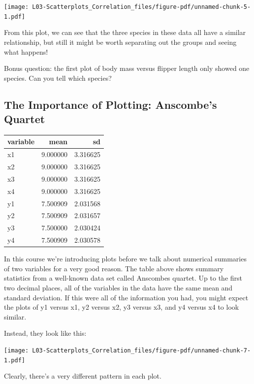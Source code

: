 \documentclass[
  letterpaper,
  DIV=11,
  numbers=noendperiod,
  oneside]{scrreprt}
\begin{document}
\texttt{[image: L03-Scatterplots\_Correlation\_files/figure-pdf/unnamed-chunk-5-1.pdf]}

From this plot, we can see that the three species in these data all have
a similar relationship, but still it might be worth separating out the
groups and seeing what happens!

Bonus question: the first plot of body mass versus flipper length only
showed one species. Can you tell which species?

\hypertarget{the-importance-of-plotting-anscombes-quartet}{%
\subsection{The Importance of Plotting: Anscombe's
Quartet}\label{the-importance-of-plotting-anscombes-quartet}}

\begin{longtable}[]{@{}lrr@{}}
\toprule\noalign{}
variable & mean & sd \\
\midrule\noalign{}
\endhead
\bottomrule\noalign{}
\endlastfoot
x1 & 9.000000 & 3.316625 \\
x2 & 9.000000 & 3.316625 \\
x3 & 9.000000 & 3.316625 \\
x4 & 9.000000 & 3.316625 \\
y1 & 7.500909 & 2.031568 \\
y2 & 7.500909 & 2.031657 \\
y3 & 7.500000 & 2.030424 \\
y4 & 7.500909 & 2.030578 \\
\end{longtable}

In this course we're introducing plots before we talk about numerical
summaries of two variables for a very good reason. The table above shows
summary statistics from a well-known data set called Anscombes quartet.
Up to the first two decimal places, all of the variables in the data
have the same mean and standard deviation. If this were all of the
information you had, you might expect the plots of y1 versus x1, y2
versus x2, y3 versus x3, and y4 versus x4 to look similar.

Instead, they look like this:

\texttt{[image: L03-Scatterplots\_Correlation\_files/figure-pdf/unnamed-chunk-7-1.pdf]}

Clearly, there's a very different pattern in each plot.
\end{document}
